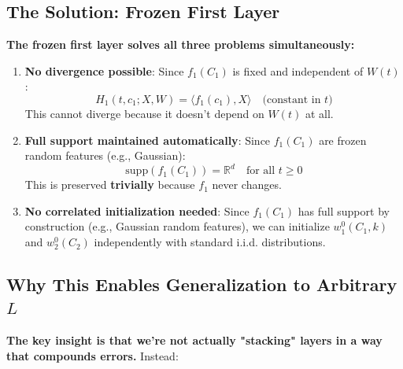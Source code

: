 \subsection{The Solution: Frozen First Layer}

\textbf{The frozen first layer solves all three problems simultaneously:}

\begin{enumerate}
\item \textbf{No divergence possible}: Since $f_1(C_1)$ is fixed and independent of $W(t)$:
   \[
   H_1(t, c_1; X, W) = \langle f_1(c_1), X\rangle \quad \text{(constant in $t$)}
   \]
   This cannot diverge because it doesn't depend on $W(t)$ at all.

\item \textbf{Full support maintained automatically}: Since $f_1(C_1)$ are frozen random features (e.g., Gaussian):
   \[
   \text{supp}(f_1(C_1)) = \mathbb{R}^d \quad \text{for all $t \geq 0$}
   \]
   This is preserved \textbf{trivially} because $f_1$ never changes.

\item \textbf{No correlated initialization needed}: Since $f_1(C_1)$ has full support by construction (e.g., Gaussian random features), we can initialize $w_1^0(C_1, k)$ and $w_2^0(C_2)$ independently with standard i.i.d. distributions.
\end{enumerate}

\subsection{Why This Enables Generalization to Arbitrary $L$}

\textbf{The key insight is that we're not actually "stacking" layers in a way that compounds errors.} Instead:

